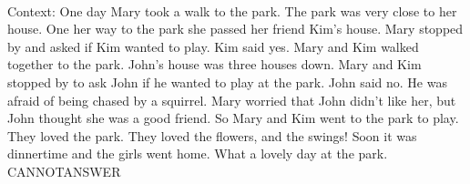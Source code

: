 \documentclass[11pt,a4paper, onecolumn]{article}
\begin{document}
\\ Context: One day Mary took a walk to the park. The park was very close to her house. One her way to the park she passed her friend Kim's house. Mary stopped by and asked if Kim wanted to play. Kim said yes. Mary and Kim walked together to the park. John's house was three houses down. Mary and Kim stopped by to ask John if he wanted to play at the park. John said no. He was afraid of being chased by a squirrel. Mary worried that John didn't like her, but John thought she was a good friend. So Mary and Kim went to the park to play. They loved the park. They loved the flowers, and the swings! Soon it was dinnertime and the girls went home. What a lovely day at the park. CANNOTANSWER
\end{document}
